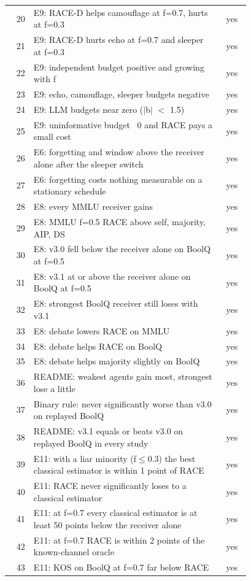 \begin{longtable}{@{}r p{0.78\linewidth} c@{}}
20 & E9: RACE-D helps camouflage at f=0.7, hurts at f=0.3 & yes\\
21 & E9: RACE-D hurts echo at f=0.7 and sleeper at f=0.3 & yes\\
22 & E9: independent budget positive and growing with f & yes\\
23 & E9: echo, camouflage, sleeper budgets negative & yes\\
24 & E9: LLM budgets near zero ($|$b$|$ $<$ 1.5) & yes\\
25 & E9: uninformative budget ~0 and RACE pays a small cost & yes\\
26 & E6: forgetting and window above the receiver alone after the sleeper switch & yes\\
27 & E6: forgetting costs nothing measurable on a stationary schedule & yes\\
28 & E8: every MMLU receiver gains & yes\\
29 & E8: MMLU f=0.5 RACE above self, majority, AIP, DS & yes\\
30 & E8: v3.0 fell below the receiver alone on BoolQ at f=0.5 & yes\\
31 & E8: v3.1 at or above the receiver alone on BoolQ at f=0.5 & yes\\
32 & E8: strongest BoolQ receiver still loses with v3.1 & yes\\
33 & E8: debate lowers RACE on MMLU & yes\\
34 & E8: debate helps RACE on BoolQ & yes\\
35 & E8: debate helps majority slightly on BoolQ & yes\\
36 & README: weakest agents gain most, strongest lose a little & yes\\
37 & Binary rule: never significantly worse than v3.0 on replayed BoolQ & yes\\
38 & README: v3.1 equals or beats v3.0 on replayed BoolQ in every study & yes\\
39 & E11: with a liar minority (f$\le$0.3) the best classical estimator is within 1 point of RACE & yes\\
40 & E11: RACE never significantly loses to a classical estimator & yes\\
41 & E11: at f=0.7 every classical estimator is at least 50 points below the receiver alone & yes\\
42 & E11: at f=0.7 RACE is within 2 points of the known-channel oracle & yes\\
43 & E11: KOS on BoolQ at f=0.7 far below RACE & yes\\

\end{longtable}
